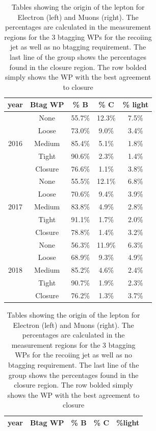 \begin{table}
  \centering
  \caption{Tables showing the origin of the lepton for Electron (left) and Muons (right). The percentages are calculated in the measurement regions for the 3 btagging WPs for the recoiing jet as well as no btagging requirement. The last line of the group shows the percentages found in the closure region. The row bolded simply shows the WP with the best agreement to closure}\label{tab:lepton_nonprompt_percentages}
  \begin{tabular}{c c c c c }
    \hline
    year                  & Btag WP & \% B   & \% C   & \% light \\
    \hline
    \multirow{5}{*}{2016} & None    & 55.7\% & 12.3\%  & 7.5\%    \\
                          & Loose   & 73.0\% & 9.0\%  & 3.4\%    \\
                          & Medium  & 85.4\% & 5.1\%  & 1.8\%    \\
                          & Tight   & 90.6\% & 2.3\%  & 1.4\%    \\
                          & Closure & 76.6\% & 1.1\%  & 3.8\%    \\
    \hline
    \multirow{5}{*}{2017} & None    & 55.5\% & 12.1\% & 6.8\%    \\
                          & Loose   & 70.6\% & 9.4\%  & 3.9\%    \\
                          & Medium  & 83.8\% & 4.9\%  & 2.8\%    \\
                          & Tight   & 91.1\% & 1.7\%  & 2.0\%    \\
                          & Closure & 78.8\% & 1.4\%  & 3.2\%    \\
    \hline
    \multirow{5}{*}{2018} & None    & 56.3\% & 11.9\%  & 6.3\%    \\
                          & Loose   & 68.9\% & 9.3\%  & 4.9\%    \\
                          & Medium  & 85.2\% & 4.6\%  & 2.4\%    \\
                          & Tight   & 90.7\% & 1.9\%  & 2.3\%    \\
                          & Closure & 76.2\% & 1.3\%  & 3.7\%    \\
    \hline
  \end{tabular}
  \qquad
  \begin{tabular}{c c c c c}
    \hline
    year                  & Btag WP & \% B   & \% C   & \%light \\
    \hline

\end{tabular}
\end{table}
